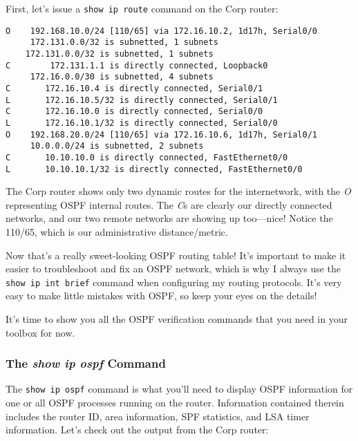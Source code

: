 First, let's issue a \texttt{show\ ip\ route} command on the Corp
router:

\begin{verbatim}
O    192.168.10.0/24 [110/65] via 172.16.10.2, 1d17h, Serial0/0
     172.131.0.0/32 is subnetted, 1 subnets
    172.131.0.0/32 is subnetted, 1 subnets
C        172.131.1.1 is directly connected, Loopback0
     172.16.0.0/30 is subnetted, 4 subnets
C       172.16.10.4 is directly connected, Serial0/1
L       172.16.10.5/32 is directly connected, Serial0/1
C       172.16.10.0 is directly connected, Serial0/0
L       172.16.10.1/32 is directly connected, Serial0/0
O    192.168.20.0/24 [110/65] via 172.16.10.6, 1d17h, Serial0/1
     10.0.0.0/24 is subnetted, 2 subnets
C       10.10.10.0 is directly connected, FastEthernet0/0
L       10.10.10.1/32 is directly connected, FastEthernet0/0
\end{verbatim}

\protect\hypertarget{c18.xhtmlux5cux23Page_766}{}{}The Corp router shows
only two dynamic routes for the internetwork, with the \emph{O}
representing OSPF internal routes. The \emph{C}s are clearly our
directly connected networks, and our two remote networks are showing up
too---nice! Notice the 110/65, which is our administrative
distance/metric.

Now that's a really sweet-looking OSPF routing table! It's important to
make it easier to troubleshoot and fix an OSPF network, which is why I
always use the \texttt{show\ ip\ int\ brief} command when configuring my
routing protocols. It's very easy to make little mistakes with OSPF, so
keep your eyes on the details!

It's time to show you all the OSPF verification commands that you need
in your toolbox for now.

\subsubsection[The \emph{show ip ospf}
Command]{\texorpdfstring{\protect\hypertarget{c18.xhtmlux5cux23c18-sec-12}{}{}The
\emph{show ip ospf} Command}{The show ip ospf Command}}

The \texttt{show\ ip\ ospf} command is what you'll need to display OSPF
information for one or all OSPF processes running on the router.
Information contained therein includes the router ID, area information,
SPF statistics, and LSA timer information. Let's check out the output
from the Corp router:


